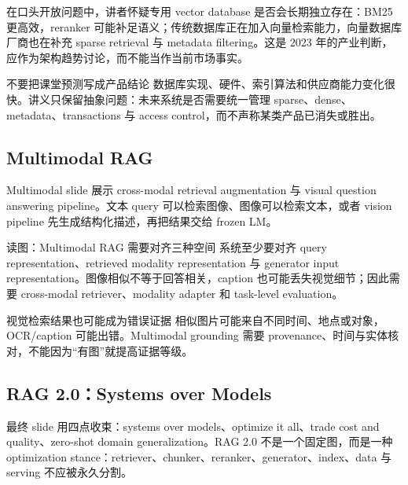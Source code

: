 在口头开放问题中，讲者怀疑专用 vector database 是否会长期独立存在：BM25 更高效，reranker 可能补足语义；传统数据库正在加入向量检索能力，向量数据库厂商也在补充 sparse retrieval 与 metadata filtering。这是 2023 年的产业判断，应作为架构趋势讨论，而不能当作当前市场事实。

\begin{warningbox}{不要把课堂预测写成产品结论}
数据库实现、硬件、索引算法和供应商能力变化很快。讲义只保留抽象问题：未来系统是否需要统一管理 sparse、dense、metadata、transactions 与 access control，而不声称某类产品已消失或胜出。
\end{warningbox}

\subsection{Multimodal RAG}

Multimodal slide 展示 cross-modal retrieval augmentation 与 visual question answering pipeline。文本 query 可以检索图像、图像可以检索文本，或者 vision pipeline 先生成结构化描述，再把结果交给 frozen LM。


\begin{knowledgebox}{读图：Multimodal RAG 需要对齐三种空间}
系统至少要对齐 query representation、retrieved modality representation 与 generator input representation。图像相似不等于回答相关，caption 也可能丢失视觉细节；因此需要 cross-modal retriever、modality adapter 和 task-level evaluation。
\end{knowledgebox}

\begin{warningbox}{视觉检索结果也可能成为错误证据}
相似图片可能来自不同时间、地点或对象，OCR/caption 可能出错。Multimodal grounding 需要 provenance、时间与实体核对，不能因为“有图”就提高证据等级。
\end{warningbox}


\subsection{RAG 2.0：Systems over Models}

最终 slide 用四点收束：systems over models、optimize it all、trade cost and quality、zero-shot domain generalization。RAG 2.0 不是一个固定图，而是一种 optimization stance：retriever、chunker、reranker、generator、index、data 与 serving 不应被永久分割。

